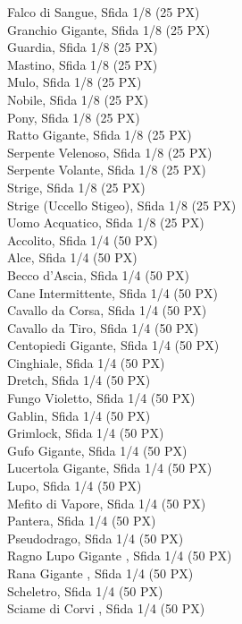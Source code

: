 \begin{multicols}{3}
{		Falco di Sangue, Sfida 1/8 (25 PX)\\
		Granchio Gigante, Sfida 1/8 (25 PX)\\
		Guardia, Sfida 1/8 (25 PX)\\
		Mastino, Sfida 1/8 (25 PX)\\
		Mulo, Sfida 1/8 (25 PX)\\
		Nobile, Sfida 1/8 (25 PX)\\
		Pony, Sfida 1/8 (25 PX)\\
		Ratto Gigante, Sfida 1/8 (25 PX)\\
		Serpente Velenoso, Sfida 1/8 (25 PX)\\
		Serpente Volante, Sfida 1/8 (25 PX)\\
		Strige, Sfida 1/8 (25 PX)\\
		Strige (Uccello Stigeo), Sfida 1/8 (25 PX)\\
		Uomo Acquatico, Sfida 1/8 (25 PX)\\
		Accolito, Sfida 1/4 (50 PX)\\
		Alce, Sfida 1/4 (50 PX)\\
		Becco d'Ascia, Sfida 1/4 (50 PX)\\
		Cane Intermittente, Sfida 1/4 (50 PX)\\
		Cavallo da Corsa, Sfida 1/4 (50 PX)\\
		Cavallo da Tiro, Sfida 1/4 (50 PX)\\
		Centopiedi Gigante, Sfida 1/4 (50 PX)\\
		Cinghiale, Sfida 1/4 (50 PX)\\
		Dretch, Sfida 1/4 (50 PX)\\
		Fungo Violetto, Sfida 1/4 (50 PX)\\
		Gablin, Sfida 1/4 (50 PX)\\
		Grimlock, Sfida 1/4 (50 PX)\\
		Gufo Gigante, Sfida 1/4 (50 PX)\\
		Lucertola Gigante, Sfida 1/4 (50 PX)\\
		Lupo, Sfida 1/4 (50 PX)\\
		Mefito di Vapore, Sfida 1/4 (50 PX)\\
		Pantera, Sfida 1/4 (50 PX)\\
		Pseudodrago, Sfida 1/4 (50 PX)\\
		Ragno Lupo Gigante  , Sfida 1/4 (50 PX)\\
		Rana Gigante  , Sfida 1/4 (50 PX)\\
		Scheletro, Sfida 1/4 (50 PX)\\
		Sciame di Corvi  , Sfida 1/4 (50 PX)\\
}
\end{multicols}
